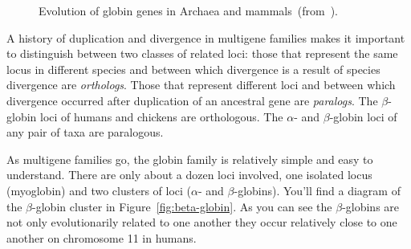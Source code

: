 \begin{figure}
\begin{center}
\end{center}
\caption{Evolution of globin genes in Archaea and
  mammals~(from~\cite{Freitas-etal2004}).}\label{fig:globins}
\end{figure}

A history of duplication and divergence in multigene families makes it
important to distinguish between two classes of related loci: those
that represent the same locus in different species and between which
divergence is a result of species divergence are {\it
  orthologs}. Those that represent different loci and between which
divergence occurred after duplication of an ancestral gene are {\it
  paralogs}. The $\beta$-globin loci of humans and chickens are
orthologous. The $\alpha$- and $\beta$-globin loci of any pair of taxa
are paralogous.

As multigene families go, the globin family is relatively simple and
easy to understand. There are only about a dozen loci involved, one
isolated locus (myoglobin) and two clusters of loci ($\alpha$- and
$\beta$-globins). You'll find a diagram of the $\beta$-globin cluster
in Figure~\ref{fig:beta-globin}. As you can see the $\beta$-globins
are not only evolutionarily related to one another they occur
relatively close to one another on chromosome 11 in humans.

